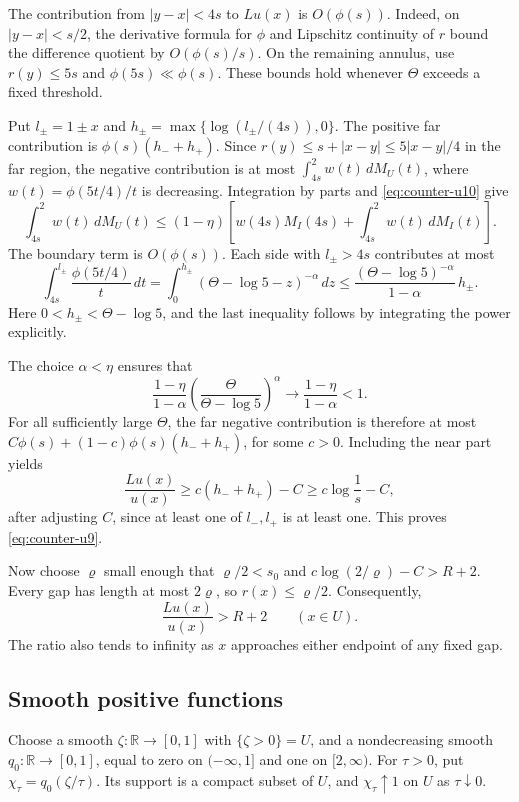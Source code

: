 \documentclass[11pt]{article}
\theoremstyle{remark}
\numberwithin{equation}{section}
\newcommand{\R}{\mathbb R}
\begin{document}
The contribution from \(|y-x|<4s\) to \(Lu(x)\) is \(O(\phi(s))\).
Indeed, on \(|y-x|<s/2\), the derivative formula for \(\phi\) and
Lipschitz continuity of \(r\) bound the difference quotient by
\(O(\phi(s)/s)\). On the remaining annulus, use
\(r(y)\le5s\) and \(\phi(5s)\ll\phi(s)\).
These bounds hold whenever \(\Theta\) exceeds a fixed threshold.

Put \(l_\pm=1\pm x\) and \(h_\pm=\max\{\log(l_\pm/(4s)),0\}\).
The positive far contribution is \(\phi(s)(h_-+h_+)\).
Since \(r(y)\le s+|x-y|\le5|x-y|/4\) in the far region, the negative
contribution is at most \(\int_{4s}^2 w(t)\,dM_U(t)\), where
\(w(t)=\phi(5t/4)/t\) is decreasing. Integration by parts and
\eqref{eq:counter-u10} give
\[
 \int_{4s}^2 w(t)\,dM_U(t)
 \le(1-\eta)\left[w(4s)M_I(4s)+
                       \int_{4s}^2 w(t)\,dM_I(t)\right].
\]
The boundary term is \(O(\phi(s))\). Each side with \(l_\pm>4s\)
contributes at most
\[
 \int_{4s}^{l_\pm}\frac{\phi(5t/4)}t\,dt
 =\int_0^{h_\pm}(\Theta-\log5-z)^{-\alpha}\,dz
 \le\frac{(\Theta-\log5)^{-\alpha}}{1-\alpha}\,h_\pm.
\]
Here \(0<h_\pm<\Theta-\log5\), and the last inequality follows by
integrating the power explicitly.

The choice \(\alpha<\eta\) ensures that
\[
 \frac{1-\eta}{1-\alpha}
 \left(\frac{\Theta}{\Theta-\log5}\right)^\alpha
 \longrightarrow\frac{1-\eta}{1-\alpha}<1.
\]
For all sufficiently large \(\Theta\), the far negative contribution
is therefore at most
\(C\phi(s)+(1-c)\phi(s)(h_-+h_+)\), for some \(c>0\).
Including the near part yields
\[
 \frac{Lu(x)}{u(x)}\ge c(h_-+h_+)-C
 \ge c\log\frac1s-C,
\]
after adjusting \(C\), since at least one of \(l_-,l_+\) is at least
one. This proves \eqref{eq:counter-u9}.

Now choose \(\varrho\) small enough that
\(\varrho/2<s_0\) and \(c\log(2/\varrho)-C>R+2\).
Every gap has length at most \(2\varrho\), so \(r(x)\le\varrho/2\).
Consequently,
\begin{equation}\label{eq:counter-u14}
 \frac{Lu(x)}{u(x)}>R+2\qquad(x\in U).
\end{equation}
The ratio also tends to infinity as \(x\) approaches either endpoint
of any fixed gap.

\subsection{Smooth positive functions}\label{subsec:counter-smooth}

Choose a smooth \(\zeta:\R\to[0,1]\) with \(\{\zeta>0\}=U\), and a
nondecreasing smooth \(q_0:\R\to[0,1]\), equal to zero on
\((-\infty,1]\) and one on \([2,\infty)\).
For \(\tau>0\), put \(\chi_\tau=q_0(\zeta/\tau)\).
Its support is a compact subset of \(U\), and
\(\chi_\tau\uparrow1\) on \(U\) as \(\tau\downarrow0\).
\end{document}
